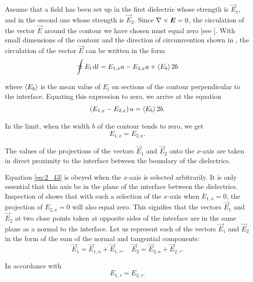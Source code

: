 Assume that a field has been set up in the first dielectric whose strength is $\vec{E}_1$, and in the second one whose strength is $\vec{E}_2$. Since $\nabla\times\boldsymbol{E}=0$, the circulation of the vector $\vec{E}$ around the contour we have chosen must equal zero [see ]. With small dimensions of the contour and the direction of circumvention shown in , the circulation of the vector $\vec{E}$ can be written in the form
\begin{equation}\label{eq:2_42}
    \oint E_l\,\mathrm{d} l = E_{1,x} a - E_{2,x} a + \left\langle E_b \right\rangle 2b
\end{equation}

\noindent
where $\left\langle E_b \right\rangle$ is the mean value of $E_l$ on sections of the contour perpendicular to the interface. Equating this expression to zero, we arrive at the equation
\begin{equation*}
    \left(E_{1,x} - E_{2,x}\right) a = \left\langle E_b \right\rangle 2b.
\end{equation*}

\noindent
In the limit, when the width $b$ of the contour tends to zero, we get
\begin{equation}\label{eq:2_43}
    E_{1,x} = E_{2,x}.
\end{equation}

\noindent
The values of the projections of the vectors $\vec{E}_1$ and $\vec{E}_2$ onto the $x$-axis are taken in direct proximity to the interface between the boundary of the dielectrics.

Equation \eqref{eq:2_43} is obeyed when the $x$-axis is selected arbitrarily. It is only essential that this axis be in the plane of the interface between the dielectrics. Inspection of  shows that with such a selection of the $x$-axis when $E_{1,x}=0$, the projection of $E_{2,x}=0$ will also equal zero. This signifies that the vectors $\vec{E}_1$ and $\vec{E}_2$ at two close points taken at opposite sides of the interface are in the same plane as a normal to the interface. Let us represent each of the vectors $\vec{E}_1$ and $\vec{E}_2$ in the form of the sum of the normal and tangential components:
\begin{equation*}
    \vec{E}_1 = \vec{E}_{1,n} + \vec{E}_{1,\tau},\quad \vec{E}_2 = \vec{E}_{2,n} + \vec{E}_{2,\tau}.
\end{equation*}

\noindent
In accordance with 
\begin{equation}\label{eq:2_44}
    E_{1,\tau} = E_{2,\tau}.
\end{equation}

